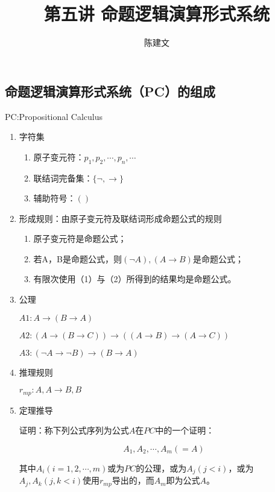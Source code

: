 \documentclass{article}
\begin{document}
\begin{CJK*}{UTF8}{gbsn}
  \title{第五讲 命题逻辑演算形式系统}
  \author{陈建文}
  \maketitle
  \section{命题逻辑演算形式系统（PC）的组成}

  PC:Propositional Calculus

  \begin{enumerate}
    \item 字符集
    \begin{enumerate}
      \item 原子变元符：$p_1,p_2,\cdots,p_n,\cdots$
      \item 联结词完备集：$\{\lnot, \to\}$
      \item 辅助符号：$()$
    \end{enumerate}
    \item 形成规则：由原子变元符及联结词形成命题公式的规则

    \begin{enumerate}
      \item 原子变元符是命题公式；
      \item 若A，B是命题公式，则$(\lnot A), (A\to B)$是命题公式；
      \item 有限次使用（1）与（2）所得到的结果均是命题公式。
    \end{enumerate}

    \item 公理  
  
    $A1:A\to(B\to A)$

    $A2:(A\to(B\to C))\to((A\to B)\to (A\to C))$

    $A3:(\lnot A\to \lnot B)\to (B \to A)$

    \item 推理规则 
    
    $r_{mp}:A,A\to B, B$

    \item 定理推导
    

    证明：称下列公式序列为公式$A$在$PC$中的一个证明：

    \[A_1,A_2,\cdots,A_m(=A)\]

    其中$A_i(i=1,2,\cdots,m)$或为$PC$的公理，或为$A_j(j<i)$，或为$A_j,A_k(j,k<i)$使用$r_{mp}$导出的，而$A_m$即为公式$A$。



\end{enumerate}
\end{CJK*}
\end{document}

